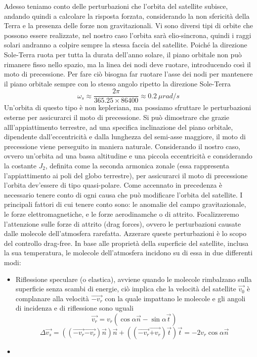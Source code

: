 Adesso teniamo conto delle perturbazioni che l'orbita del satellite subisce,
andando quindi a calcolare la risposta forzata, considerando la non sfericità
della Terra e la presenza delle forze non gravitazionali. Vi sono diversi tipi
di orbite che possono essere realizzate, nel nostro caso l'orbita sarà
elio-sincrona, quindi i raggi solari andranno a colpire sempre la stessa faccia
del satellite. Poiché la direzione Sole-Terra ruota per tutta la durata
dell'anno solare, il piano orbitale non può rimanere fisso nello spazio, ma la
linea dei nodi deve ruotare, introducendo così il moto di precessione. Per fare
ciò bisogna far ruotare l'asse dei nodi per mantenere il piano orbitale sempre
con lo stesso angolo ripetto la direzione Sole-Terra
\begin{equation}
\omega_s\approx \frac{2\pi}{365.25\times86400}\approx 0.2 \ \mu rad/s
\end{equation}
Un'orbita di questo tipo è non kepleriana, ma possiamo sfruttare le
perturbazioni esterne per assicurarci il moto di precessione. Si può dimostrare
che grazie alll'appiattimento terrestre, ad una specifica inclinazione del piano
orbitale, dipendente dall'eccentricità e dalla lunghezza del semi-asse maggiore,
il moto di precessione viene perseguito in maniera naturale. Considerando il
nostro caso, ovvero un'orbita ad una bassa altitudine e una piccola eccentricità
e considerando la costante $J_2$, definita come la seconda armonica zonale (essa
rappresenta l'appiattimento ai poli del globo terrestre), per assicurarci il
moto di precessione l'orbita dev'essere di tipo quasi-polare.
Come accennato in precedenza è necessario tenere conto di ogni causa che può
modificare l’orbita del satellite. I principali fattori di cui tenere conto
sono: le anomalie del campo gravitazionale, le forze elettromagnetiche, e le
forze aerodinamche o di attrito. Focalizzeremo l'attenzione sulle forze
di attrito (drag forces), ovvero le perturbazioni causate dalle molecole
dell'atmosfera rarefatta. Azzerare queste perturbazioni è lo scopo del controllo
drag-free.
In base alle proprietà della superficie del satellite, inclusa la sua
temperatura, le molecole dell'atmosfera incidono su di essa in due differenti
modi:
\begin{itemize}
  \item Riflessione speculare (o elastica), avviene quando le molecole
  rimbalzano sulla superficie senza scambi di energie, ciò implica che la
  velocità del satellite $\vec{v_0}$ è complanare alla velocità $\vec{-v_r}$ con
  la quale impattano le molecole e gli angoli di incidenza e di riflessione sono
  uguali
\begin{equation}
\vec{v_r}=v_r(\cos{\alpha \vec{n}}-\sin{\alpha \vec{t}}) \nonumber
\end{equation}
\begin{equation}
\Delta \vec{v_s}=((\vec{-v_r}\vec{-v_r})\vec{n})\vec{n} +
((\vec{-v_r}\vec{+v_r})\vec{t})\vec{t} = -2v_r\cos{\alpha \vec{n}}
\end{equation}
  \item 
\end{itemize}


